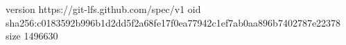 version https://git-lfs.github.com/spec/v1
oid sha256:c0183592b996b1d2dd5f2a68fe17f0ea77942c1ef7ab0aa896b7402787e22378
size 1496630
